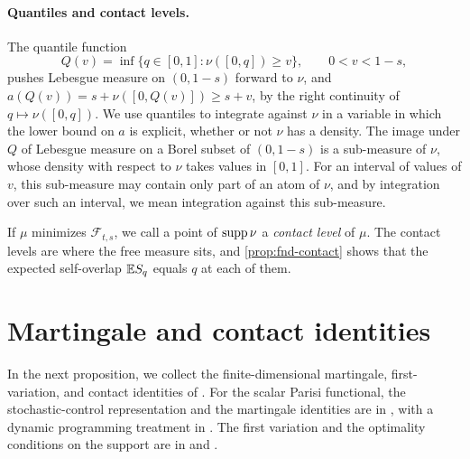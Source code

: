 \paragraph{Quantiles and contact levels.}
The quantile function
\begin{equation}\label{eq:fnd-quantile}
 Q(v)=\inf\{q\in[0,1]:\nu([0,q])\ge v\},\qquad 0<v<1-s,
\end{equation}
pushes Lebesgue measure on $(0,1-s)$ forward to $\nu$, and
$a(Q(v))=s+\nu([0,Q(v)])\ge s+v$, by the right continuity of
$q\mapsto\nu([0,q])$. We use quantiles to integrate against $\nu$ in a
variable in which the lower bound on $a$ is explicit, whether or not
$\nu$ has a density. The image under $Q$ of Lebesgue measure on a Borel
subset of $(0,1-s)$ is a sub-measure of $\nu$, whose density with respect
to $\nu$ takes
values in $[0,1]$. For an interval of values of
$v$, this sub-measure may contain only part of an atom of $\nu$, and by
integration over such an interval, we mean integration against
this sub-measure.

If $\mu$ minimizes $\mathcal F_{t,s}$, we call a point of $\operatorname{supp}\nu$ a
\emph{contact level} of $\mu$. The contact levels are where the free
measure sits, and \cref{prop:fnd-contact} shows that the expected self-overlap
$\mathbb E S_q$ equals $q$ at each of them.

\section{Martingale and contact identities}\label{sec:fnd-contact}

In the next proposition, we collect the finite-dimensional martingale,
first-variation, and contact identities of \cite[Proposition~2.1]{AL}.
For the scalar Parisi functional, the stochastic-control representation
and the martingale identities are in
\cite[Theorem~3 and Lemma~2]{AuffingerChen2015Uniqueness}, with a dynamic
programming treatment in \cite{JagannathTobasco2016}. The first variation
and the optimality conditions on the support are in
\cite[Lemma~3.2 and Proposition~1.1]{JagannathTobasco2017PhaseDiagram}
and \cite[Theorem~2 and Proposition~1]{Chen2017Variational}.

